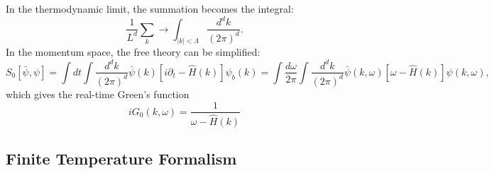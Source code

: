 \documentclass[aps,prb,superscriptaddress,nofootinbib]{revtex4}
\begin{document}
In the thermodynamic limit, the summation becomes the integral: 
\begin{equation}
	\frac{1}{L^d}\sum_k \longrightarrow \int_{|k|<\Lambda} \frac{d^d k}{(2\pi)^d}.
\end{equation}
In the momentum space, the free theory can be simplified:
\begin{equation}
	S_0[\bar\psi,\psi] = \int dt \int \frac{d^d k}{(2\pi)^d} \bar\psi(k) [i\partial_t-\hat H(k)]\psi_b(k)
	= \int\frac{d\omega}{2\pi}\int\frac{d^d k}{(2\pi)^d} \bar\psi(k, \omega)[\omega - \hat H(k)]\psi(k, \omega),
\end{equation}
which gives the real-time Green's function
\begin{equation}
	iG_0(k,\omega) = \frac{1}{\omega - \hat H(k)}
\end{equation}



\subsection{Finite Temperature Formalism}
\end{document}
